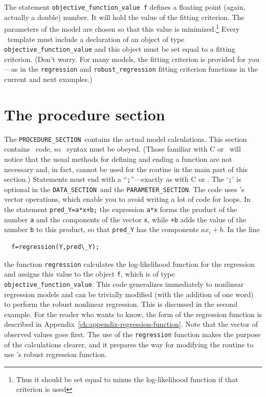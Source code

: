 \documentclass{admbmanual}
\newcommand\DS{\texttt{DATA\_SECTION}}
\newcommand\PS{\texttt{PARAMETER\_SECTION}}
\newcommand\PROS{\texttt{PROCEDURE\_SECTION}}
\begin{document}
The statement  \texttt{objective\_function\_value f} defines a floating 
point 
(again, actually a double) number. It will hold the
value of the fitting criterion. The parameters of the model are
chosen so that this value is minimized.\footnote{Thus it should be set equal to
minus the log-likelihood function if that criterion is used} 
Every \ADM\ template
must include a declaration of an object of type 
\texttt{objective\_function\_value} and  this object must be
set equal to a fitting criterion. (Don't worry. For many
models, the
fitting criterion is provided for you---as in the \texttt{regression}
and \texttt{robust\_regression} fitting criterion functions 
in the current and next examples.)


\section{The procedure section}

The \PROS\ contains the actual model calculations.
This section contains \cplus\ code, so \cplus\ syntax must be obeyed.
(Those familiar with C or \cplus\ will notice that the usual
methods for defining and ending a function are not necessary 
and, in fact, cannot be used for the routine in the main part of this
section.) 
Statements must end with a ``\texttt{;}''---exactly as with C or \cplus.  
The `\texttt{;}' is
optional in the \DS\ and the \PS.
The code uses \scAD's vector operations, which enable you to avoid
writing a lot of code for loops.
In the statement \texttt{pred\_Y=a*x+b;} the expression \texttt{a*x}
forms the product of the number \texttt{a} and the components of the
vector \texttt{x}, while \texttt{+b} adds the value of the number \texttt{b}
to this product, so that \texttt{pred\_Y} has the components 
$ax_i+b$.
In the line
\begin{lstlisting}
  f=regression(Y,pred\_Y);
\end{lstlisting}
 the function 
\texttt{regression} calculates the log-likelihood function for
the regression and assigns this value to the object \texttt{f},
which is of type \texttt{objective\_function\_value}. 
This code generalizes immediately to
nonlinear regression models and can be trivially
modified (with the addition of one word) to perform the robust nonlinear
regression.  This is discussed in the second example. For the reader who wants to know,
the form of the regression function is described in Appendix~\ref{ch:appendix-regression-function}.
Note that the vector of observed values goes first. 
The use of the \texttt{regression} function makes the purpose of the
calculations clearer, and it prepares the way for
modifying the routine to use \ADM's robust regression
function.
\end{document}
